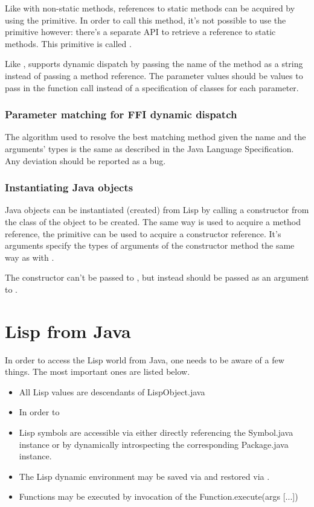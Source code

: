 \documentclass[10pt]{book}
\begin{document}
Like with non-static methods, references to static methods can be acquired
by using the  primitive. In order to call this method,
it's not possible to use the  primitive however: there's a 
separate API to retrieve a reference to static methods. This
primitive is called . 

Like ,  supports dynamic dispatch by
passing the name of the method as a string instead of passing a method reference.
The parameter values should be values to pass in the function call instead of
a specification of classes for each parameter.

\subsubsection{Parameter matching for FFI dynamic dispatch}

The algorithm used to resolve the best matching method given the name
and the arguments' types is the same as described in the Java Language
Specification. Any deviation should be reported as a bug.


\subsubsection{Instantiating Java objects}

Java objects can be instantiated (created) from Lisp by calling
a constructor from the class of the object to be created. The same way
 is used to acquire a method reference, the
 primitive can be used to acquire a constructor
reference. It's arguments specify the types of arguments of the constructor
method the same way as with .

The constructor can't be passed to , but instead should
be passed as an argument to .

\section{Lisp from Java}

In order to access the Lisp world from Java, one needs to be aware
of a few things. The most important ones are listed below.

\begin{itemize}
\item All Lisp values are descendants of LispObject.java
\item In order to 
\item Lisp symbols are accessible via either directly referencing the
  Symbol.java instance or by dynamically introspecting the
  corresponding Package.java instance.
\item The Lisp dynamic environment may be saved via
   and restored via
  .
\item Functions may be executed by invocation of the
  Function.execute(args [...]) 
\end{itemize}
\end{document}

